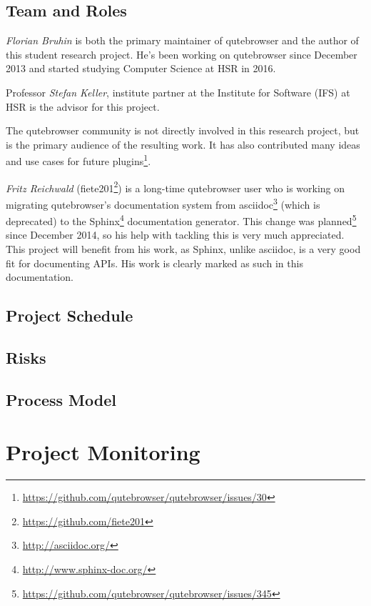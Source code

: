 \documentclass[a4paper,parskip=full]{scrreprt}
\begin{document}
\section{Team and Roles}
\emph{Florian Bruhin} is both the primary maintainer of qutebrowser and the
author of this student research project. He's been working on qutebrowser since
December 2013 and started studying Computer Science at HSR in 2016.

Professor \emph{Stefan Keller}, institute partner at the Institute for Software
(IFS) at HSR is the advisor for this project.

The qutebrowser community is not directly involved in this research project, but
is the primary audience of the resulting work. It has also contributed many
ideas and use cases for future
plugins\footnote{\url{https://github.com/qutebrowser/qutebrowser/issues/30}}.

\emph{Fritz Reichwald} (fiete201\footnote{\url{https://github.com/fiete201}})
is a long-time qutebrowser user who is working on migrating qutebrowser's
documentation system from asciidoc\footnote{\url{http://asciidoc.org/}} (which
is deprecated) to the Sphinx\footnote{\url{http://www.sphinx-doc.org/}}
documentation generator. This change was
planned\footnote{\url{https://github.com/qutebrowser/qutebrowser/issues/345}}
since December 2014, so his help with tackling this is very much appreciated.
This project will benefit from his work, as Sphinx, unlike asciidoc, is a
very good fit for documenting APIs. His work is clearly marked as such in this
documentation.

\section{Project Schedule}
\section{Risks}
\section{Process Model}

\chapter{Project Monitoring}
\end{document}
